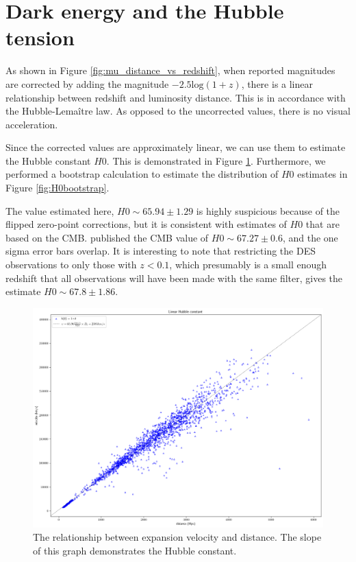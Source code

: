 \documentclass[linenumbers]{aastex631}
\begin{document}
\section{Dark energy and the Hubble tension}
\label{sec:tension}

As shown in Figure \ref{fig:mu_distance_vs_redshift}, when reported magnitudes
are corrected by adding the magnitude $-2.5\text{log}(1+z)$, there is a linear
relationship between redshift and luminosity distance. This is in accordance
with the Hubble-Lema\^{i}tre law. As opposed to the uncorrected values, there
is no visual acceleration.

Since the corrected values are approximately linear, we can use them to
estimate the Hubble constant $H0$. This is demonstrated in Figure
\ref{fig:expansion}. Furthermore, we performed a bootstrap calculation to
estimate the distribution of $H0$ estimates in Figure \ref{fig:H0bootstrap}.

The value estimated here, $H0 \sim 65.94 \pm 1.29$ is highly suspicious because
of the flipped zero-point corrections, but it is consistent with estimates of
$H0$ that are based on the CMB. \citet{planck2020} published the CMB value of
$H0 \sim 67.27 \pm 0.6$, and the one sigma error bars overlap. It is
interesting to note that restricting the DES observations to only those with $z
< 0.1$, which presumably is a small enough redshift that all observations will
have been made with the same filter, gives the estimate
$H0 \sim 67.8 \pm 1.86$.

\begin{figure}
  \includegraphics[width=\linewidth]{velocity_vs_distance.png}
  \caption{The relationship between expansion velocity and distance. The slope of this graph demonstrates the Hubble constant.
  }
\label{fig:expansion}
\end{figure}
\end{document}
